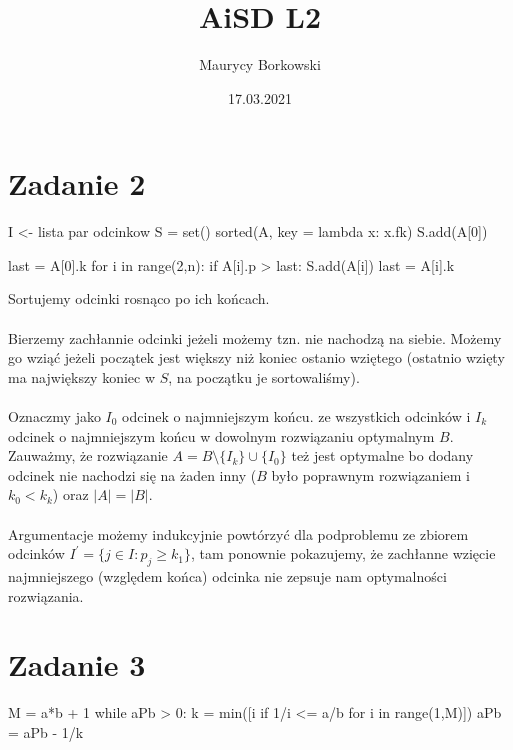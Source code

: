 \documentclass{article}
\title{AiSD L2}
\date{17.03.2021}
\author{Maurycy Borkowski}
\begin{document}
\maketitle

\section{Zadanie 2}
\begin{python}
I <- lista par odcinkow
S = set()
sorted(A, key = lambda x: x.fk)
S.add(A[0])

last = A[0].k
for i in range(2,n):
    if A[i].p > last:
        S.add(A[i])
        last = A[i].k
\end{python}
Sortujemy odcinki rosnąco po ich końcach.\\\\
Bierzemy zachłannie odcinki jeżeli możemy tzn. nie nachodzą na siebie. Możemy go wziąć jeżeli początek jest większy niż koniec ostanio wziętego (ostatnio wzięty ma największy koniec w $S$, na początku je sortowaliśmy).\\\\
Oznaczmy jako $I_0$ odcinek o najmniejszym końcu. ze wszystkich odcinków i $I_k$ odcinek o najmniejszym końcu w dowolnym rozwiązaniu optymalnym $B$. Zauważmy, że rozwiązanie $A = B \setminus \{I_k\} \cup \{I_0\}$ też jest optymalne bo dodany odcinek nie nachodzi się na żaden inny ($B$ było poprawnym rozwiązaniem i $k_0 < k_k$) oraz $|A| = |B|$.\\\\
Argumentacje możemy indukcyjnie powtórzyć dla podproblemu ze zbiorem odcinków $I^\prime = \{j \in I: p_j \geq k_1\}$, tam ponownie pokazujemy, że zachłanne wzięcie najmniejszego (względem końca) odcinka nie zepsuje nam optymalności rozwiązania.
\section{Zadanie 3}
\begin{python}
M = a*b + 1
while aPb > 0:
    k = min([i if 1/i <= a/b for i in range(1,M)])
    aPb = aPb - 1/k
\end{python}
\end{document}
